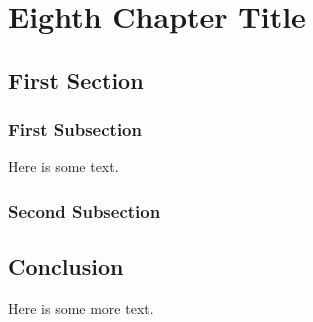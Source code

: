  \chapter{Eighth Chapter Title}


\section{First Section}
\subsection{First Subsection}
Here is some text. 

\subsection{Second Subsection}

\section{Conclusion}
Here is some more text. 